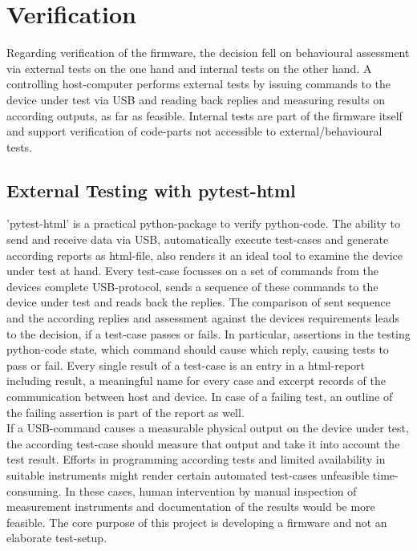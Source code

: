 \documentclass[master,english,smartquotes,apa]{hgbthesis}
\begin{document}

		
		
		\section{Verification}
				Regarding verification of the firmware, the decision fell on behavioural assessment via external tests on the one hand and internal tests on the other hand. A controlling host-computer performs external tests by issuing commands to the device under test via USB and reading back replies and measuring results on according outputs, as far as feasible. Internal tests are part of the firmware itself and support verification of code-parts not accessible to external/behavioural tests.
			\subsection{External Testing with pytest-html}
				'pytest-html' is a practical python-package to verify python-code. The ability to send and receive data via USB, automatically execute test-cases and generate according reports as html-file, also renders it an ideal tool to examine the device under test at hand. Every test-case focusses on a set of commands from the devices complete USB-protocol, sends a sequence of these commands to the device under test and reads back the replies. The comparison of sent sequence and the according replies and assessment against the devices requirements leads to the decision, if a test-case passes or fails. In particular, assertions in the testing python-code state, which command should cause which reply, causing tests to pass or fail. Every single result of a test-case is an entry in a html-report including result, a meaningful name for every case and excerpt records of the communication between host and device. In case of a failing test, an outline of the failing assertion is part of the report as well. \\
				If a USB-command causes a measurable physical output on the device under test, the according test-case should measure that output and take it into account the test result. Efforts in programming according tests and limited availability in suitable instruments might render certain automated test-cases unfeasible time-consuming. In these cases, human intervention by manual inspection of measurement instruments and documentation of the results would be more feasible. The core purpose of this project is developing a firmware and not an elaborate test-setup. \\
\end{document}
